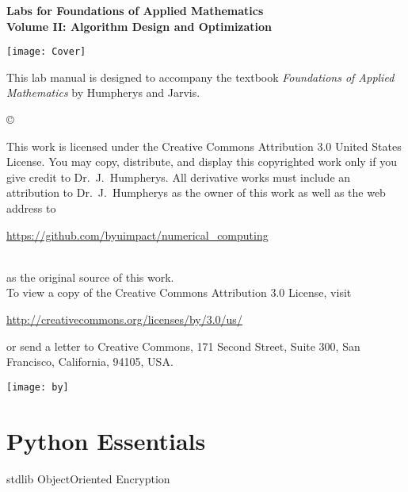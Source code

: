 \documentclass[nociteref]{SIAM-GH-book}
\begin{document}
\thispagestyle{empty}

\begin{center}
{\huge \bf Labs for Foundations of Applied Mathematics} \\
\vspace{5mm}
{\Large \bf Volume II: Algorithm
Design and Optimization}
\vspace{20mm}

\texttt{[image: Cover]}
\end{center}
\frontmatter




\begin{thepreface}
This lab manual is designed to accompany the textbook \emph{Foundations of Applied Mathematics} by Humpherys and Jarvis.

\vfill
\copyright{This work is licensed under the Creative Commons Attribution 3.0 United States
License.  You may copy, distribute, and display this copyrighted work only if you give
credit to Dr.~J.~Humpherys. All derivative works must include an attribution to Dr.~J.~Humpherys as the owner of this work as well as the web address to
\\\centerline{\url{https://github.com/byuimpact/numerical_computing}}\\ as the original source of
this
work.\\To view a copy of the Creative Commons Attribution 3.0 License,
visit\\\centerline{\url{http://creativecommons.org/licenses/by/3.0/us/}} or send a letter to
Creative Commons, 171 Second Street, Suite 300, San Francisco, California, 94105, USA.}

\vfill
\centering\texttt{[image: by]}
\vfill
\end{thepreface}

\setcounter{tocdepth}{1}
\tableofcontents

\mainmatter

\part{Python Essentials}
{stdlib}
{ObjectOriented}
{Encryption}
\end{document}

